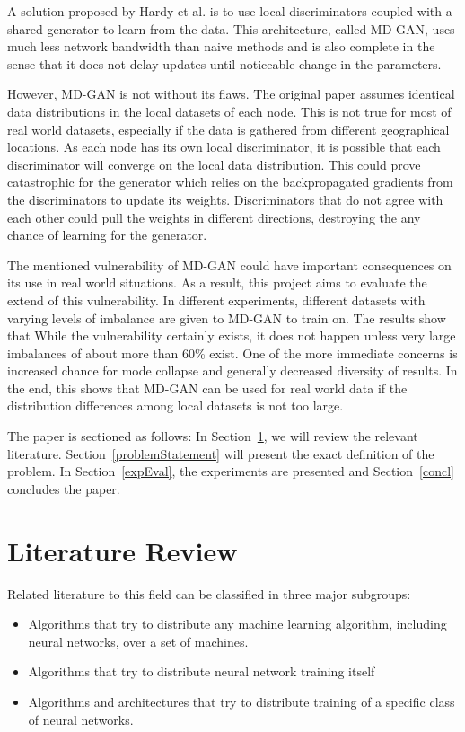 \documentclass[11pt]{article}       %
\begin{document}
A solution proposed by Hardy et al.\cite{Hardy2019} is to use local discriminators coupled with a shared generator to learn from the data. This architecture, called MD-GAN, uses much less network bandwidth than naive methods and is also complete in the sense that it does not delay updates until noticeable change in the parameters. 

However, MD-GAN is not without its flaws. The original paper assumes identical data distributions in the local datasets of each node. This is not true for most of real world datasets, especially if the data is gathered from different geographical locations. As each node has its own local discriminator, it is possible that each discriminator will converge on the local data distribution. This could prove catastrophic for the generator which relies on the backpropagated gradients from the discriminators to update its weights. Discriminators that do not agree with each other could pull the weights in different directions, destroying the any chance of learning for the generator.

The mentioned vulnerability of MD-GAN could have important consequences on its use in real world situations. As a result, this project aims to evaluate the extend of this vulnerability. In different experiments, different datasets with varying levels of imbalance are given to MD-GAN to train on. The results show that While the vulnerability certainly exists, it does not happen unless very large imbalances of about more than 60\% exist. One of the more immediate concerns is increased chance for mode collapse and generally decreased diversity of results. In the end, this shows that MD-GAN can be used for real world data if the distribution differences among local datasets is not too large.

The paper is sectioned as follows: In Section~\ref{litrev}, we will
review the relevant literature. Section~\ref{problemStatement} will present the exact definition of the problem. In Section~\ref{expEval}, the experiments are presented and Section~\ref{concl} concludes the paper.


\section{Literature Review} \label{litrev}

Related literature to this field can be classified in three major subgroups:
\begin{itemize}
\item Algorithms that try to distribute any machine learning algorithm, including neural networks, over a set of machines.
\item Algorithms that try to distribute neural network training itself
\item Algorithms and architectures that try to distribute training of a specific class of neural networks.
\end{itemize}
\end{document}
